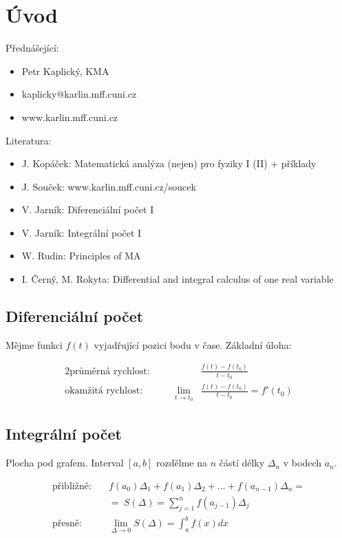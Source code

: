 \chapter*{Úvod}

Přednášející:
\begin{itemize}
    \item Petr Kaplický, KMA
    \item kaplicky@karlin.mff.cuni.cz
    \item www.karlin.mff.cuni.cz
\end{itemize}

Literatura:
\begin{itemize}
    \item J. Kopáček: Matematická analýza (nejen) pro fyziky I (II) + příklady
    \item J. Souček: www.karlin.mff.cuni.cz/soucek
    \item V. Jarník: Diferenciální počet I
    \item V. Jarník: Integrální počet I
    \item W. Rudin: Principles of MA
    \item I. Černý, M. Rokyta: Differential and integral calculus of one real variable
\end{itemize}

\section{Diferenciální počet}
Mějme funkci $f(t)$ vyjadřující pozici bodu v čase. Základní úloha:

\begin{alignat}{2}
    \text{průměrná rychlost:}&\quad  &   &\frac{f(t) - f(t_0)}{t - t_0} \\
    \text{okamžitá rychlost:}&\quad  &   \lim_{t \to t_0}&\frac{f(t) - f(t_0)}{t - t_0} = f'(t_0)
\end{alignat}

\section{Integrální počet}
Plocha pod grafem. Interval $[a, b]$ rozdělme na $n$ částí délky $\Delta_n$ v bodech $a_n$.

\begin{align}
    \text{přibližně:}\quad  &   f(a_0)\Delta_1 + f(a_1)\Delta_2 + \text{...} +
        f(a_{n-1})\Delta_n = \nonumber \\
            &   =~S(\Delta) = \sum_{j=1}^{n}f(a_{j-1})\Delta_j \\
    \text{přesně:}\quad &   \lim_{\Delta \to 0} S(\Delta) = \int_{a}^{b}f(x)dx
\end{align}
